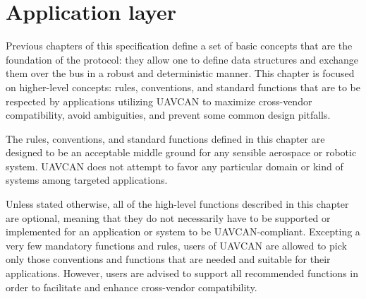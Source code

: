 \chapter{Application layer}\label{sec:application_layer}

Previous chapters of this specification define a set of basic concepts that are the foundation of the protocol:
they allow one to define data structures and exchange them over the bus in a robust and deterministic manner.
This chapter is focused on higher-level concepts: rules, conventions, and standard functions that are to be
respected by applications utilizing UAVCAN to maximize cross-vendor compatibility, avoid ambiguities, and
prevent some common design pitfalls.

The rules, conventions, and standard functions defined in this chapter are designed to be an acceptable middle
ground for any sensible aerospace or robotic system.
UAVCAN does not attempt to favor any particular domain or kind of systems among targeted applications.

Unless stated otherwise, all of the high-level functions described in this chapter are optional,
meaning that they do not necessarily have to be supported or implemented for an application or system to be
UAVCAN-compliant.
Excepting a very few mandatory functions and rules, users of UAVCAN are allowed to pick only those conventions
and functions that are needed and suitable for their applications.
However, users are advised to support all recommended functions in order to facilitate and enhance
cross-vendor compatibility.

\clearpage
\clearpage
